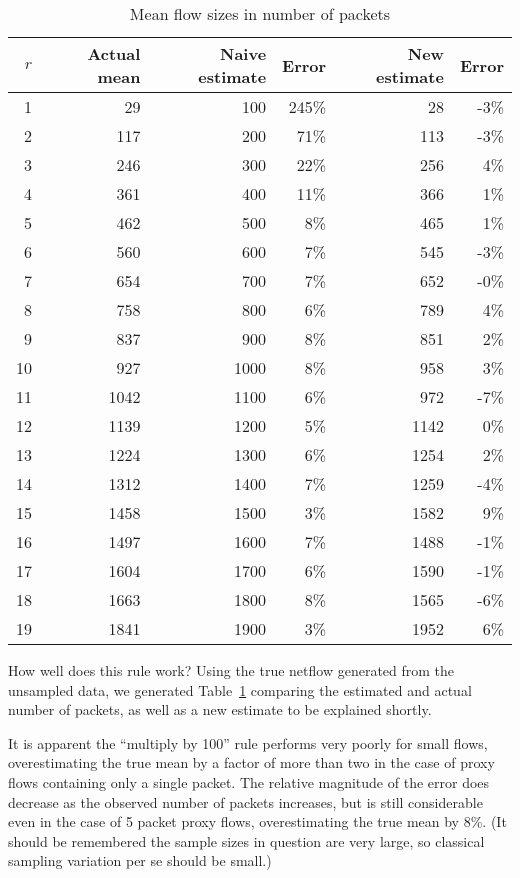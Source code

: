 \documentclass{paper}
\begin{document}
\begin{table}
\begin{center}
\begin{tabular}{r r r r r r}
$r$ & Actual mean & Naive estimate & Error & New estimate & Error \\
\midrule
 1 &   29 &  100 & 245\% &   28 & -3\% \\
 2 &  117 &  200 &  71\% &  113 & -3\% \\
 3 &  246 &  300 &  22\% &  256 &  4\% \\
 4 &  361 &  400 &  11\% &  366 &  1\% \\
 5 &  462 &  500 &   8\% &  465 &  1\% \\
 6 &  560 &  600 &   7\% &  545 & -3\% \\
 7 &  654 &  700 &   7\% &  652 & -0\% \\
 8 &  758 &  800 &   6\% &  789 &  4\% \\
 9 &  837 &  900 &   8\% &  851 &  2\% \\
10 &  927 & 1000 &   8\% &  958 &  3\% \\
11 & 1042 & 1100 &   6\% &  972 & -7\% \\
12 & 1139 & 1200 &   5\% & 1142 &  0\% \\
13 & 1224 & 1300 &   6\% & 1254 &  2\% \\
14 & 1312 & 1400 &   7\% & 1259 & -4\% \\
15 & 1458 & 1500 &   3\% & 1582 &  9\% \\
16 & 1497 & 1600 &   7\% & 1488 & -1\% \\
17 & 1604 & 1700 &   6\% & 1590 & -1\% \\
18 & 1663 & 1800 &   8\% & 1565 & -6\% \\
19 & 1841 & 1900 &   3\% & 1952 &  6\% \\
\end{tabular}
\caption{Mean flow sizes in number of packets}
\label{mean_flow_size}
\end{center}
\end{table}

How well does this rule work? Using the true netflow generated from the
unsampled data, we generated Table~\ref{mean_flow_size} comparing the estimated
and actual number of packets, as well as a new estimate to be explained shortly.

It is apparent the ``multiply by 100'' rule performs very poorly for small
flows, overestimating the true mean by a factor of more than two in the case of
proxy flows containing only a single packet. The relative magnitude of the error
does decrease as the observed number of packets increases, but is still
considerable even in the case of 5 packet proxy flows, overestimating the true
mean by 8\%. (It should be remembered the sample sizes in question are very
large, so classical sampling variation per se should be small.)
\end{document}
